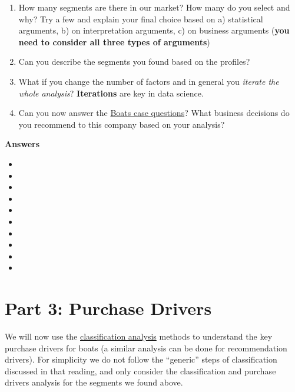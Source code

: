 \documentclass[
]{article}
\providecommand{\tightlist}{%
  \setlength{\itemsep}{0pt}\setlength{\parskip}{0pt}}
\begin{document}
\begin{enumerate}
\def\labelenumi{\arabic{enumi}.}
\tightlist
\item
  How many segments are there in our market? How many do you select and
  why? Try a few and explain your final choice based on a) statistical
  arguments, b) on interpretation arguments, c) on business arguments
  (\textbf{you need to consider all three types of arguments})
\item
  Can you describe the segments you found based on the profiles?
\item
  What if you change the number of factors and in general you
  \emph{iterate the whole analysis}? \textbf{Iterations} are key in data
  science.
\item
  Can you now answer the
  \href{http://inseaddataanalytics.github.io/INSEADAnalytics/Boats-A-prerelease.pdf}{Boats
  case questions}? What business decisions do you recommend to this
  company based on your analysis?
\end{enumerate}

\textbf{Answers}

\begin{itemize}
\tightlist
\item
\item
\item
\item
\item
\item
\item
\item
\item
\item
\end{itemize}

\clearpage

\hypertarget{part-3-purchase-drivers}{%
\section{Part 3: Purchase Drivers}\label{part-3-purchase-drivers}}

We will now use the
\href{http://inseaddataanalytics.github.io/INSEADAnalytics/CourseSessions/Sessions67/ClassificationAnalysisReading.html}{classification
analysis} methods to understand the key purchase drivers for boats (a
similar analysis can be done for recommendation drivers). For simplicity
we do not follow the ``generic'' steps of classification discussed in
that reading, and only consider the classification and purchase drivers
analysis for the segments we found above.
\end{document}
